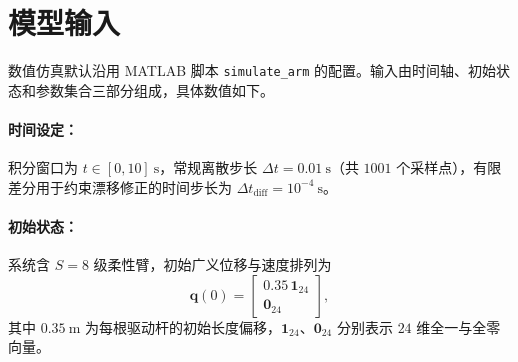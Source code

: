 \documentclass[12pt,a4paper]{article}
\begin{document}
\section{模型输入}
数值仿真默认沿用 MATLAB 脚本 \texttt{simulate\_arm} 的配置。输入由时间轴、初始状态和参数集合三部分组成，具体数值如下。

\paragraph{时间设定：}
积分窗口为 $t\in[0,10]~\si{\second}$，常规离散步长 $\Delta t = 0.01~\si{\second}$（共 $1001$ 个采样点），有限差分用于约束漂移修正的时间步长为 $\Delta t_{\text{diff}} = 10^{-4}~\si{\second}$。

\paragraph{初始状态：}
系统含 $S = 8$ 级柔性臂，初始广义位移与速度排列为
\begin{equation}
  \bm q(0) = \begin{bmatrix}
    0.35\,\bm 1_{24} \\
    \bm 0_{24}
  \end{bmatrix},
\end{equation}
其中 $0.35~\si{\meter}$ 为每根驱动杆的初始长度偏移，$\bm 1_{24}$、$\bm 0_{24}$ 分别表示 $24$ 维全一与全零向量。
\end{document}
